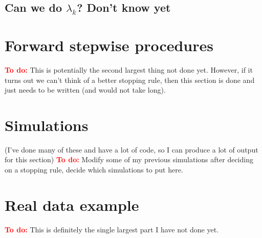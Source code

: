 \documentclass{imsart}
\newcommand{\todo}{\textcolor{red}{\textbf{To do: }}}
\begin{document}
\subsection{Can we do $\lambda_k$? Don't know yet}

\section{Forward stepwise procedures}
\todo This is potentially the second largest thing not done yet. However, if it turns out we can't think of a better stopping rule, then this section is done and just needs to be written (and would not take long).

\section{Simulations }
(I've done many of these and have a lot of code, so I can produce a lot of output for this section)
\todo Modify some of my previous simulations after deciding on a stopping rule, decide which simulations to put here.

\section{Real data example}
\todo This is definitely the single largest part I have not done yet.
\end{document}
